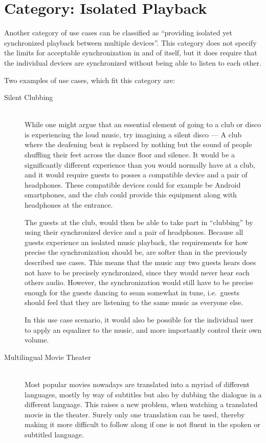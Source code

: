 \section{Category: Isolated Playback}\label{sec:category_isolated_playback}
Another category of use cases can be classified as \enquote{providing isolated yet synchronized playback between multiple devices}.
This category does not specify the limits for acceptable synchronization in and of itself, but it does require that the individual devices are synchronized without being able to listen to each other.

Two examples of use cases, which fit this category are:
\begin{description}
    \item[Silent Clubbing] \hfill\\
        While one might argue that an essential element of going to a club or disco is experiencing the loud music, try imagining a silent disco ---
        A club where the deafening beat is replaced by nothing but the sound of people shuffling their feet across the dance floor and silence.
        It would be a significantly different experience than you would normally have at a club, and it would require guests to posses a compatible device and a pair of headphones.
        These compatible devices could for example be Android smartphones, and the club could provide this equipment along with headphones at the entrance.

        The guests at the club, would then be able to take part in \enquote{clubbing} by using their synchronized device and a pair of headphones.
        Because all guests experience an isolated music playback, the requirements for how precise the synchronization should be, are softer than in the previously described use cases.
        This means that the music any two guests hears does not have to be precisely synchronized, since they would never hear each others audio.
        However, the synchronization would still have to be precise enough for the guests dancing to seam somewhat in tune, i.e.~guests should feel that they are listening to the same music as everyone else.

        In this use case scenario, it would also be possible for the individual user to apply an equalizer to the music, and more importantly control their own volume.
    \item[Multilingual Movie Theater] \hfill\\
        Most popular movies nowadays are translated into a myriad of different languages, mostly by way of subtitles but also by dubbing the dialogue in a different language.
        This raises a new problem, when watching a translated movie in the theater.
        Surely only one translation can be used, thereby making it more difficult to follow along if one is not fluent in the spoken or subtitled language.


\end{description}
